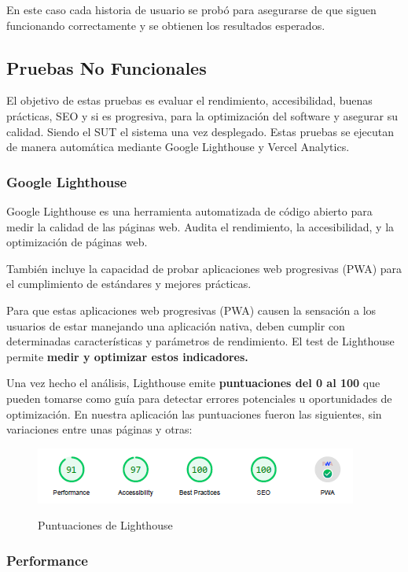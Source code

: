 \documentclass[12pt,twoside,titlepage]{report}
\begin{document}
En este caso cada historia de usuario se probó para asegurarse de que siguen funcionando correctamente y se obtienen los resultados esperados.

\subsection{Pruebas No Funcionales}

El objetivo de estas pruebas es evaluar el rendimiento, accesibilidad, buenas prácticas, SEO y si es progresiva, para la optimización del software y asegurar su calidad. Siendo el SUT el sistema una vez desplegado. Estas pruebas se ejecutan de manera automática mediante Google Lighthouse y Vercel Analytics.

\subsubsection{Google Lighthouse}

Google Lighthouse es una herramienta automatizada de código abierto para medir la calidad de las páginas web. Audita el rendimiento, la accesibilidad, y la optimización de páginas web.

También incluye la capacidad de probar aplicaciones web progresivas (PWA) para el cumplimiento de estándares y mejores prácticas.

Para que estas aplicaciones web progresivas (PWA) causen la sensación a los usuarios de estar manejando una aplicación nativa, deben cumplir con determinadas características y parámetros de rendimiento. El test de Lighthouse permite \textbf{medir y optimizar estos indicadores.}

Una vez hecho el análisis, Lighthouse emite \textbf{puntuaciones del 0 al 100} que pueden tomarse como guía para detectar errores potenciales u oportunidades de optimización. En nuestra aplicación las puntuaciones fueron las siguientes, sin variaciones entre unas páginas y otras:

\begin{figure}[H]
    \centering
    \includegraphics[scale=1.2]{Lighthouse/Resumen}
    \label{fig:Lighthouse_resumen}
    \caption{Puntuaciones de Lighthouse}
\end{figure}

\subsubsection{Performance}
\end{document}

